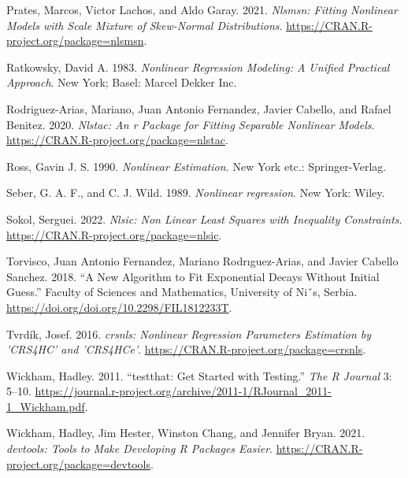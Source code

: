 \begin{CSLReferences}
Prates, Marcos, Victor Lachos, and Aldo Garay. 2021. \emph{Nlsmsn: Fitting Nonlinear Models with Scale Mixture of Skew-Normal Distributions}. \url{https://CRAN.R-project.org/package=nlsmsn}.

Ratkowsky, David A. 1983. \emph{Nonlinear Regression Modeling: A Unified Practical Approach}. New York; Basel: Marcel Dekker Inc.

Rodriguez-Arias, Mariano, Juan Antonio Fernandez, Javier Cabello, and Rafael Benitez. 2020. \emph{Nlstac: An r Package for Fitting Separable Nonlinear Models}. \url{https://CRAN.R-project.org/package=nlstac}.

Ross, Gavin J. S. 1990. \emph{Nonlinear Estimation.} New York etc.: Springer-Verlag.

Seber, G. A. F., and C. J. Wild. 1989. \emph{{Nonlinear regression}}. New York: Wiley.

Sokol, Serguei. 2022. \emph{Nlsic: Non Linear Least Squares with Inequality Constraints}. \url{https://CRAN.R-project.org/package=nlsic}.

Torvisco, Juan Antonio Fernandez, Mariano Rodrıguez-Arias, and Javier Cabello Sanchez. 2018. {``A New Algorithm to Fit Exponential Decays Without Initial Guess.''} {Faculty of Sciences and Mathematics, University of Niˇs, Serbia}. \url{https://doi.org/doi.org/10.2298/FIL1812233T}.

Tvrdík, Josef. 2016. \emph{{crsnls: Nonlinear Regression Parameters Estimation by 'CRS4HC' and 'CRS4HCe'}}. \url{https://CRAN.R-project.org/package=crsnls}.

Wickham, Hadley. 2011. {``{testthat: Get Started with Testing}.''} \emph{The R Journal} 3: 5--10. \url{https://journal.r-project.org/archive/2011-1/RJournal_2011-1_Wickham.pdf}.

Wickham, Hadley, Jim Hester, Winston Chang, and Jennifer Bryan. 2021. \emph{{devtools: Tools to Make Developing R Packages Easier}}. \url{https://CRAN.R-project.org/package=devtools}.

\end{CSLReferences}



